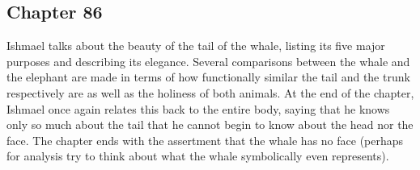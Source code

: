 \subsection{Chapter 86}

Ishmael talks about the beauty of the tail of the whale, listing its five major
purposes and describing its elegance. Several comparisons between the whale and
the elephant are made in terms of how functionally similar the tail and the
trunk respectively are as well as the holiness of both animals. At the end of
the chapter, Ishmael once again relates this back to the entire body, saying
that he knows only so much about the tail that he cannot begin to know about
the head nor the face. The chapter ends with the assertment that the whale has
no face (perhaps for analysis try to think about what the whale symbolically
even represents).
